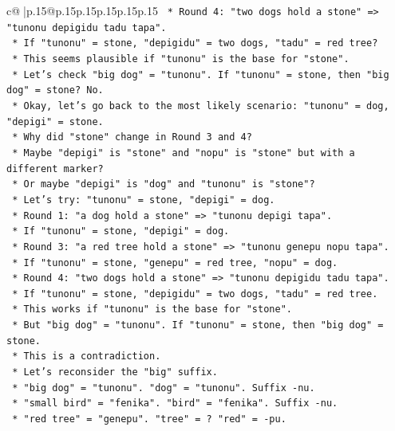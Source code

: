 \documentclass{article}
\begin{document}
{\begin{supertabular}{c@{$\;$}|p{.15\linewidth}@{}p{.15\linewidth}p{.15\linewidth}p{.15\linewidth}p{.15\linewidth}p{.15\linewidth}}
{{{\texttt{        *   Round 4: "two dogs hold a stone" => "tunonu depigidu tadu tapa".} \\
\texttt{        *   If "tunonu" = stone, "depigidu" = two dogs, "tadu" = red tree?} \\
\texttt{        *   This seems plausible if "tunonu" is the base for "stone".} \\
\texttt{        *   Let's check "big dog" = "tunonu". If "tunonu" = stone, then "big dog" = stone? No.} \\
\texttt{        *   Okay, let's go back to the most likely scenario: "tunonu" = dog, "depigi" = stone.} \\
\texttt{        *   Why did "stone" change in Round 3 and 4?} \\
\texttt{        *   Maybe "depigi" is "stone" and "nopu" is "stone" but with a different marker?} \\
\texttt{        *   Or maybe "depigi" is "dog" and "tunonu" is "stone"?} \\
\texttt{        *   Let's try: "tunonu" = stone, "depigi" = dog.} \\
\texttt{        *   Round 1: "a dog hold a stone" => "tunonu depigi tapa".} \\
\texttt{        *   If "tunonu" = stone, "depigi" = dog.} \\
\texttt{        *   Round 3: "a red tree hold a stone" => "tunonu genepu nopu tapa".} \\
\texttt{        *   If "tunonu" = stone, "genepu" = red tree, "nopu" = dog.} \\
\texttt{        *   Round 4: "two dogs hold a stone" => "tunonu depigidu tadu tapa".} \\
\texttt{        *   If "tunonu" = stone, "depigidu" = two dogs, "tadu" = red tree.} \\
\texttt{        *   This works if "tunonu" is the base for "stone".} \\
\texttt{        *   But "big dog" = "tunonu". If "tunonu" = stone, then "big dog" = stone.} \\
\texttt{        *   This is a contradiction.} \\
\texttt{        *   Let's reconsider the "big" suffix.} \\
\texttt{        *   "big dog" = "tunonu". "dog" = "tunonu". Suffix {-}nu.} \\
\texttt{        *   "small bird" = "fenika". "bird" = "fenika". Suffix {-}nu.} \\
\texttt{        *   "red tree" = "genepu". "tree" = ? "red" = {-}pu.} \\
}}}
\end{supertabular}}
\end{document}
